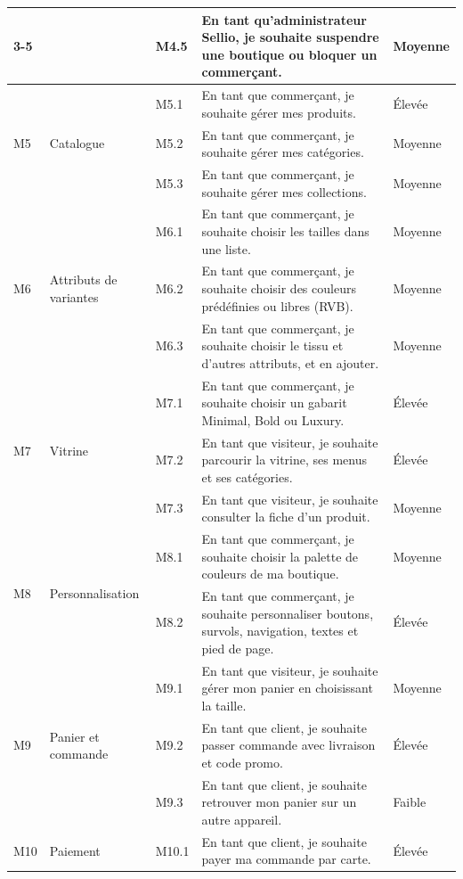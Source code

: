 \begin{longtable}{|p{0.9cm}|p{3cm}|p{1.3cm}|p{6.6cm}|p{1.9cm}|}
\cline{3-5}
 & & M4.5 & En tant qu'administrateur Sellio, je souhaite suspendre une boutique ou bloquer un commerçant. & Moyenne \\
\hline
\multirow{3}{*}{M5} & \multirow{3}{3cm}{Catalogue} & M5.1 & En tant que commerçant, je souhaite gérer mes produits. & Élevée \\
\cline{3-5}
 & & M5.2 & En tant que commerçant, je souhaite gérer mes catégories. & Moyenne \\
\cline{3-5}
 & & M5.3 & En tant que commerçant, je souhaite gérer mes collections. & Moyenne \\
\hline
\multirow{3}{*}{M6} & \multirow{3}{3cm}{Attributs de variantes} & M6.1 & En tant que commerçant, je souhaite choisir les tailles dans une liste. & Moyenne \\
\cline{3-5}
 & & M6.2 & En tant que commerçant, je souhaite choisir des couleurs prédéfinies ou libres (RVB). & Moyenne \\
\cline{3-5}
 & & M6.3 & En tant que commerçant, je souhaite choisir le tissu et d'autres attributs, et en ajouter. & Moyenne \\
\hline
\multirow{3}{*}{M7} & \multirow{3}{3cm}{Vitrine} & M7.1 & En tant que commerçant, je souhaite choisir un gabarit Minimal, Bold ou Luxury. & Élevée \\
\cline{3-5}
 & & M7.2 & En tant que visiteur, je souhaite parcourir la vitrine, ses menus et ses catégories. & Élevée \\
\cline{3-5}
 & & M7.3 & En tant que visiteur, je souhaite consulter la fiche d'un produit. & Moyenne \\
\hline
\multirow{2}{*}{M8} & \multirow{2}{3cm}{Personnalisation} & M8.1 & En tant que commerçant, je souhaite choisir la palette de couleurs de ma boutique. & Moyenne \\
\cline{3-5}
 & & M8.2 & En tant que commerçant, je souhaite personnaliser boutons, survols, navigation, textes et pied de page. & Élevée \\
\hline
\multirow{3}{*}{M9} & \multirow{3}{3cm}{Panier et commande} & M9.1 & En tant que visiteur, je souhaite gérer mon panier en choisissant la taille. & Moyenne \\
\cline{3-5}
 & & M9.2 & En tant que client, je souhaite passer commande avec livraison et code promo. & Élevée \\
\cline{3-5}
 & & M9.3 & En tant que client, je souhaite retrouver mon panier sur un autre appareil. & Faible \\
\hline
M10 & Paiement & M10.1 & En tant que client, je souhaite payer ma commande par carte. & Élevée \\

\end{longtable}

